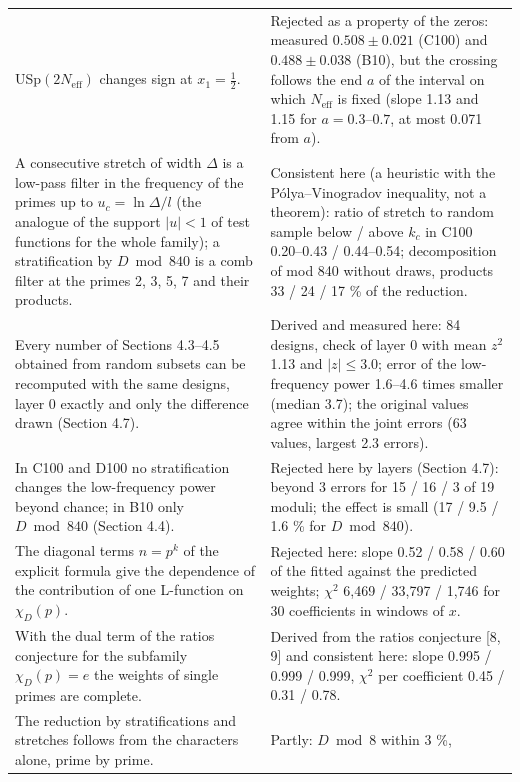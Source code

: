 \documentclass[
  10pt,
]{article}
\begin{document}
{\begin{longtable}[]{@{}
  >{\raggedright\arraybackslash}p{}
  >{\raggedright\arraybackslash}p{}@{}}
USp\((2N_{\mathrm{eff}})\) changes sign at \(x_1 = \frac12\). & Rejected
as a property of the zeros: measured \(0.508 \pm 0.021\) (C100) and
\(0.488 \pm 0.038\) (B10), but the crossing follows the end \(a\) of the
interval on which \(N_{\mathrm{eff}}\) is fixed (slope 1.13 and 1.15 for
\(a = 0.3\)--\(0.7\), at most 0.071 from \(a\)). \\ \addlinespace[2pt]
A consecutive stretch of width \(\Delta\) is a low-pass filter in the
frequency of the primes up to \(u_c = \ln\Delta/l\) (the analogue of the
support \(|u| < 1\) of test functions for the whole family); a
stratification by \(D \bmod 840\) is a comb filter at the primes 2, 3,
5, 7 and their products. & Consistent here (a heuristic with the
Pólya--Vinogradov inequality, not a theorem): ratio of stretch to random
sample below / above \(k_c\) in C100 0.20--0.43 / 0.44--0.54;
decomposition of mod 840 without draws, products 33 / 24 / 17 \% of the
reduction. \\ \addlinespace[2pt]
Every number of Sections 4.3--4.5 obtained from random subsets can be
recomputed with the same designs, layer 0 exactly and only the
difference drawn (Section 4.7). & Derived and measured here: 84 designs,
check of layer 0 with mean \(z^2\) 1.13 and \(|z| \le 3.0\); error of
the low-frequency power 1.6--4.6 times smaller (median 3.7); the
original values agree within the joint errors (63 values, largest 2.3
errors). \\ \addlinespace[2pt]
In C100 and D100 no stratification changes the low-frequency power
beyond chance; in B10 only \(D \bmod 840\) (Section 4.4). & Rejected
here by layers (Section 4.7): beyond 3 errors for 15 / 16 / 3 of 19
moduli; the effect is small (17 / 9.5 / 1.6 \% for \(D \bmod 840\)). \\ \addlinespace[2pt]
The diagonal terms \(n = p^k\) of the explicit formula give the
dependence of the contribution of one L-function on \(\chi_D(p)\). &
Rejected here: slope 0.52 / 0.58 / 0.60 of the fitted against the
predicted weights; \(\chi^2\) 6,469 / 33,797 / 1,746 for 30 coefficients
in windows of \(x\). \\ \addlinespace[2pt]
With the dual term of the ratios conjecture for the subfamily
\(\chi_D(p) = e\) the weights of single primes are complete. & Derived
from the ratios conjecture {[}8, 9{]} and consistent here: slope 0.995 /
0.999 / 0.999, \(\chi^2\) per coefficient 0.45 / 0.31 / 0.78. \\ \addlinespace[2pt]
The reduction by stratifications and stretches follows from the
characters alone, prime by prime. & Partly: \(D \bmod 8\) within 3 \%,

\end{longtable}}
\end{document}
